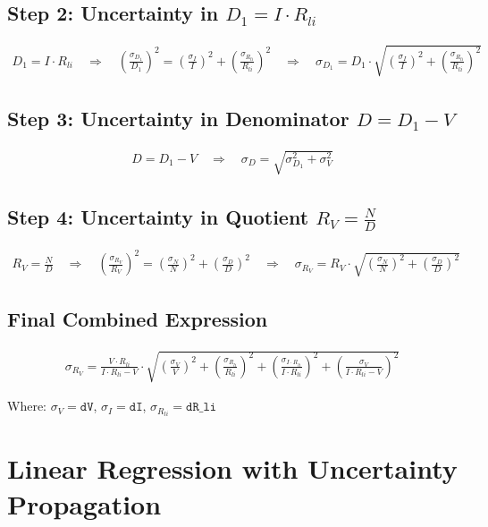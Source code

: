 \documentclass{article} %
\begin{document}
\subsection*{Step 2: Uncertainty in $D_1 = I \cdot R_{li}$}
\begin{align*}
D_1 = I \cdot R_{li} \quad \Rightarrow \quad \left(\frac{\sigma_{D_1}}{D_1}\right)^2 = \left(\frac{\sigma_I}{I}\right)^2 + \left(\frac{\sigma_{R_{li}}}{R_{li}}\right)^2 \quad \Rightarrow \quad \sigma_{D_1} = D_1 \cdot \sqrt{\left(\frac{\sigma_I}{I}\right)^2 + \left(\frac{\sigma_{R_{li}}}{R_{li}}\right)^2}
\end{align*}

\subsection*{Step 3: Uncertainty in Denominator $D = D_1 - V$}
\begin{align*}
D = D_1 - V \quad \Rightarrow \quad \sigma_D = \sqrt{\sigma_{D_1}^2 + \sigma_V^2}
\end{align*}

\subsection*{Step 4: Uncertainty in Quotient $R_V = \frac{N}{D}$}
\begin{align*}
R_V = \frac{N}{D} \quad \Rightarrow \quad \left(\frac{\sigma_{R_V}}{R_V}\right)^2 = \left(\frac{\sigma_N}{N}\right)^2 + \left(\frac{\sigma_D}{D}\right)^2 \quad \Rightarrow \quad \sigma_{R_V} = R_V \cdot \sqrt{\left(\frac{\sigma_N}{N}\right)^2 + \left(\frac{\sigma_D}{D}\right)^2}
\end{align*}

\subsection*{Final Combined Expression}
\begin{align*}
\sigma_{R_V} = \frac{V \cdot R_{li}}{I \cdot R_{li} - V} \cdot \sqrt{\left(\frac{\sigma_V}{V}\right)^2 + \left(\frac{\sigma_{R_{li}}}{R_{li}}\right)^2 + \left(\frac{\sigma_{I \cdot R_{li}}}{I \cdot R_{li}}\right)^2 + \left(\frac{\sigma_V}{I \cdot R_{li} - V}\right)^2}
\end{align*}

Where: $\sigma_V = \texttt{dV}$, $\sigma_I = \texttt{dI}$, $\sigma_{R_{li}} = \texttt{dR\_li}$

\newpage

\section{Linear Regression with Uncertainty Propagation}
\label{app:c_linear_uncertainties}
\end{document}
